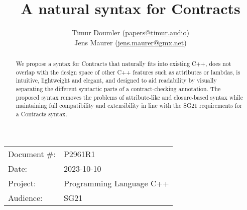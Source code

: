 



\usepackage{titlesec}
\usepackage{tocloft}


\newcommand{\changelocaltocdepth}[1]{%
  \addtocontents{toc}{\protect\setcounter{tocdepth}{#1}}%
  \setcounter{tocdepth}{#1}%
}

\setcounter{tocdepth}{3}



\title{A natural syntax for Contracts}
\author{ Timur Doumler \small(\href{mailto:papers@timur.audio}{papers@timur.audio})\\
Jens Maurer \small(\href{mailto:jens.maurer@gmx.net}{jens.maurer@gmx.net})}
\date{}
\maketitle

\begin{tabular}{ll}
Document \#: & P2961R1 \\
Date: &2023-10-10 \\
Project: & Programming Language C++ \\
Audience: & SG21
\end{tabular}

\begin{abstract}
We propose a syntax for Contracts that naturally fits into existing C++, does not overlap with the design space of other C++ features such as attributes or lambdas, is intuitive, lightweight and elegant, and designed to aid readability by visually separating the different syntactic parts of a contract-checking annotation. The proposed syntax removes the problems of attribute-like and closure-based syntax while maintaining full compatibility and extensibility in line with the SG21 requirements for a Contracts syntax.
\end{abstract}


\tableofcontents*

